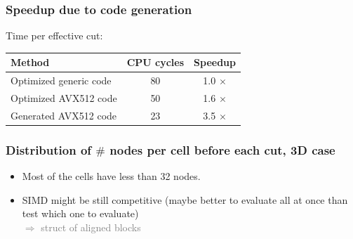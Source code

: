 \documentclass[aspectratio=169]{beamer}
\begin{document}
\begin{frame}
    \frametitle{Speedup due to code generation}

    Time per effective cut:

    \medskip
    \begin{center}    
    \begin{tabular}{|l|c|c|}
        \hline
        Method                 & CPU cycles & Speedup    \\
        \hline
        Optimized generic code & 80         & 1.0 $\times$ \\
        Optimized AVX512 code  & 50         & 1.6 $\times$ \\
        Generated AVX512 code  & 23         & 3.5 $\times$ \\
        \hline
    \end{tabular}
    \end{center}
\end{frame}


\begin{frame}
    \frametitle{Distribution of $\#$ nodes per cell before each cut, 3D case}

    \begin{minipage}[c][0.6\textheight][c]{0.4\textwidth}
        
    \end{minipage}
    \textwidth
    \begin{minipage}{0.55\textwidth}
        \begin{itemize}
            \item Most of the cells have less than 32 nodes.
            
            \bigskip
            \item SIMD might be still competitive (maybe better to evaluate all at once than test which one
            to evaluate)
                \\ \hfill {\textcolor{gray}{$\Rightarrow$ struct of aligned blocks}}
        \end{itemize}
    \end{minipage}
\end{frame}
\end{document}
